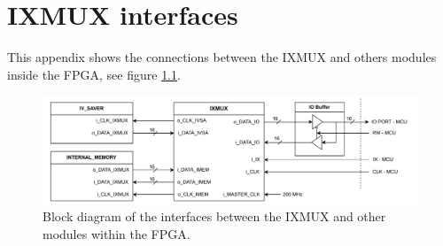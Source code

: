 \chapter{IXMUX interfaces} \label{App:IXMUX_INTERFACE}
This appendix shows the connections between the IXMUX and others modules inside the FPGA, see figure \ref{fig_App_IXMUX_INTERFACE}.

\begin{figure}[H]
    \centering
    \includegraphics[clip, trim=0 0 0 0,width=1.0\textwidth]{Appendix/Figures/IXMUX.pdf}
    \caption{Block diagram of the interfaces between the IXMUX and other modules within the FPGA.}
    \label{fig_App_IXMUX_INTERFACE}
\end{figure}

